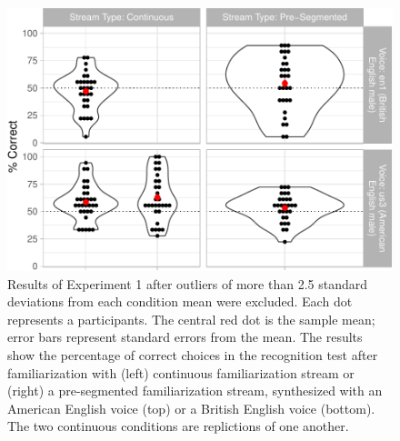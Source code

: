 \documentclass[
]{article}
\begin{document}
\begin{figure}

{\centering \includegraphics[width=0.8\linewidth]{segmentation_recall_combined_for_revision3_files/figure-latex/stats-london-stats.3x.us.en.segm.cont.combined.plot-no-outliers-1} 

}

\caption{Results of Experiment 1 after outliers of more than 2.5 standard deviations from each condition mean were excluded. Each dot represents a participants. The central red dot is the sample mean; error bars represent standard errors from the mean. The results show the percentage of correct choices in the recognition test after familiarization with (left) continuous familiarization stream or (right) a pre-segmented familiarization stream, synthesized with an American English voice (top) or a British English voice (bottom). The two continuous conditions are replictions of one another.}\label{fig:stats-london-stats.3x.us.en.segm.cont.combined.plot-no-outliers}
\end{figure}
\end{document}
